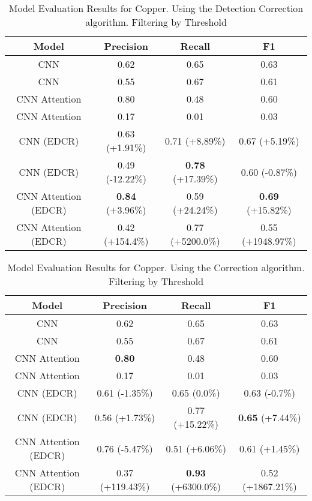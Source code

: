\begin{table}
\centering
\begin{tabular}{|c|c|c|c|}
\hline
Model & Precision & Recall & F1\\
\hline
CNN  & 0.62 & 0.65 & 0.63\\
CNN  & 0.55 & 0.67 & 0.61\\
CNN Attention & 0.80 & 0.48 & 0.60\\
CNN Attention & 0.17 & 0.01 & 0.03\\

\hline
CNN  (EDCR) & 0.63 (+1.91\%) & 0.71 (+8.89\%) & 0.67 (+5.19\%)\\
CNN  (EDCR) & 0.49 (-12.22\%) & \textbf{0.78} (+17.39\%) & 0.60 (-0.87\%)\\
CNN Attention (EDCR) & \textbf{0.84} (+3.96\%) & 0.59 (+24.24\%) & \textbf{0.69} (+15.82\%)\\
CNN Attention (EDCR) & 0.42 (+154.4\%) & 0.77 (+5200.0\%) & 0.55 (+1948.97\%)\\

\hline
\end{tabular}
\caption{Model Evaluation Results for Copper. Using the Detection Correction algorithm. Filtering by Threshold}
\end{table}
\begin{table}
\centering
\begin{tabular}{|c|c|c|c|}
\hline
Model & Precision & Recall & F1\\
\hline
CNN  & 0.62 & 0.65 & 0.63\\
CNN  & 0.55 & 0.67 & 0.61\\
CNN Attention & \textbf{0.80} & 0.48 & 0.60\\
CNN Attention & 0.17 & 0.01 & 0.03\\

\hline
CNN  (EDCR) & 0.61 (-1.35\%) & 0.65 (0.0\%) & 0.63 (-0.7\%)\\
CNN  (EDCR) & 0.56 (+1.73\%) & 0.77 (+15.22\%) & \textbf{0.65} (+7.44\%)\\
CNN Attention (EDCR) & 0.76 (-5.47\%) & 0.51 (+6.06\%) & 0.61 (+1.45\%)\\
CNN Attention (EDCR) & 0.37 (+119.43\%) & \textbf{0.93} (+6300.0\%) & 0.52 (+1867.21\%)\\

\hline
\end{tabular}
\caption{Model Evaluation Results for Copper. Using the Correction algorithm. Filtering by Threshold}
\end{table}
